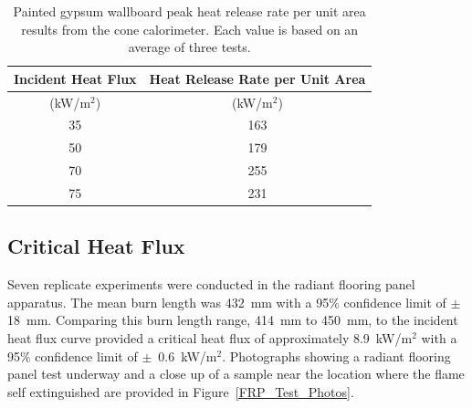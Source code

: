 \documentclass[twoside]{uocthesis}
\begin{document}
{\begin{table}
	\centering
	\begin{tabular}{|c|c|}
		\hline Incident Heat Flux & Heat Release Rate per Unit Area    \\
		\hline (kW/m$^2$) & (kW/m$^2$)  \\ 
		\hline 35 	& 163 	\\
		\hline 50	& 179   \\
		\hline 70	& 255  	\\
		\hline 75	& 231 	\\
		\hline
	\end{tabular}
	\caption[Painted gypsum wallboard peak heat release rate per unit area results]{Painted gypsum wallboard peak heat release rate per unit area results from the cone calorimeter. Each value is based on an average of three tests.}
	\label{tab:Gypsum wallboard_HRRA}
\end{table}

\subsection{Critical Heat Flux}

Seven replicate experiments were conducted in the radiant flooring panel apparatus.  The mean burn length was 432~mm with a 95$\%$ confidence limit of $\pm$18~mm. Comparing this burn length range, 414~mm to 450~mm, to the incident heat flux curve provided a critical heat flux of approximately 8.9~kW/m$^2$ with a 95$\%$ confidence limit of $\pm$~0.6~kW/m$^2$.  Photographs showing a radiant flooring panel test underway and a close up of a sample near the location where the flame self extinguished are provided in Figure~\ref{FRP_Test_Photos}. 

}
\end{document}
